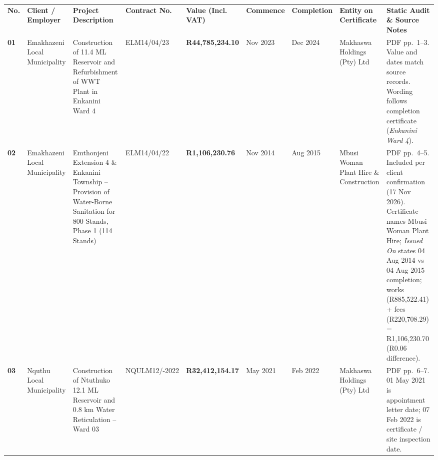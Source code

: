 \documentclass[a4paper,landscape,10pt]{article}
\begin{document}
\begin{tabularx}{\textwidth}{@{}
  >{\centering\arraybackslash}p{0.55cm}
  >{\raggedright\arraybackslash}p{2.85cm}
  >{\raggedright\arraybackslash}p{4.80cm}
  >{\raggedright\arraybackslash}p{2.35cm}
  >{\raggedleft\arraybackslash}p{2.45cm}
  >{\raggedright\arraybackslash}p{1.95cm}
  >{\raggedright\arraybackslash}p{1.95cm}
  >{\raggedright\arraybackslash}p{2.80cm}
  >{\raggedright\arraybackslash}X
@{}}

\rowcolor{MHNavy}

{\color{white}\bfseries No.} &
{\color{white}\bfseries Client / Employer} &
{\color{white}\bfseries Project Description} &
{\color{white}\bfseries Contract No.} &
{\color{white}\bfseries Value (Incl. VAT)} &
{\color{white}\bfseries Commence} &
{\color{white}\bfseries Completion} &
{\color{white}\bfseries Entity on Certificate} &
{\color{white}\bfseries Static Audit \& Source Notes} \\

\rowcolor{MHLight}

\textbf{01} &
Emakhazeni Local Municipality &
Construction of 11.4 ML Reservoir and Refurbishment of WWT Plant in Enkanini Ward 4 &
ELM14/04/23 &
\textbf{R44,785,234.10} &
27 Nov 2023 &
04 Dec 2024 &
Makhaswa Holdings (Pty) Ltd &
PDF pp.\ 1--3. Value and dates match source records. Wording follows completion certificate (\textit{Enkanini Ward 4}). \\

\arrayrulecolor{MHRule}\hline

\textbf{02} &
Emakhazeni Local Municipality &
Emthonjeni Extension 4 \& Enkanini Township -- Provision of Water-Borne Sanitation for 800 Stands, Phase 1 (114 Stands) &
ELM14/04/22 &
\textbf{R1,106,230.76} &
07 Nov 2014 &
04 Aug 2015 &
Mbusi Woman Plant Hire \& Construction &
PDF pp.\ 4--5. Included per client confirmation (17 Nov 2026). Certificate names Mbusi Woman Plant Hire; \textit{Issued On} states 04 Aug 2014 vs 04 Aug 2015 completion; works (R885,522.41) + fees (R220,708.29) = R1,106,230.70 (R0.06 difference). \\

\arrayrulecolor{MHRule}\hline

\rowcolor{MHLight}

\textbf{03} &
Nquthu Local Municipality &
Construction of Ntuthuko 12.1 ML Reservoir and 0.8 km Water Reticulation -- Ward 03 &
NQULM12/\newline 2021-2022 &
\textbf{R32,412,154.17} &
01 May 2021 &
07 Feb 2022 &
Makhaswa Holdings (Pty) Ltd &
PDF pp.\ 6--7. 01 May 2021 is appointment letter date; 07 Feb 2022 is certificate / site inspection date. \\


\end{tabularx}
\end{document}
